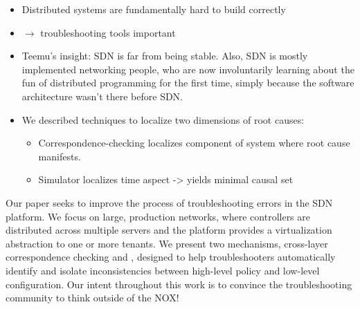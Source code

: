 \begin{itemize}
\item Distributed systems are fundamentally hard to build correctly 
\item $\rightarrow$ troubleshooting tools important
\item Teemu’s insight: SDN is far from being stable. Also, SDN is mostly implemented
networking people, who are now involuntarily learning about the fun of
distributed programming for the first time, simply because the software
architecture wasn't there before SDN.
\item We described techniques to localize two dimensions of root causes:
    \begin{itemize}
    \item Correspondence-checking localizes component of system where root cause
    manifests. 
    \item Simulator localizes time aspect -> yields minimal causal set
    \end{itemize}
\end{itemize}

Our paper seeks to improve the process of troubleshooting errors in the SDN
platform. We focus on large, production networks, 
where controllers are distributed across multiple servers
and the platform provides a virtualization abstraction to one or more tenants.
We present two mechanisms, cross-layer correspondence checking
and \simulator{}, designed to help troubleshooters automatically identify
and isolate inconsistencies between high-level policy and low-level
configuration. Our intent throughout this work is to convince
the troubleshooting community to think outside of the NOX!
